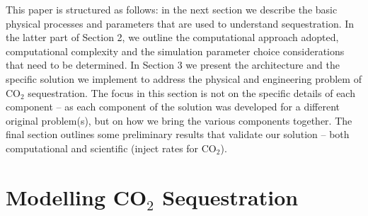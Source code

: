 \documentclass{acm_proc_article-sp}
\newcommand{\up}{\vspace*{-0.3em}}
\newcommand{\jhanote}[1]{ {\textcolor{red} { ***Jha: #1 }}}
\newcommand{\yyenote}[1]{ {\textcolor{blue} { ***yye00: #1 }}}
\newcommand{\jhanote}[1]{}
\newcommand{\yyenote}[1]{}
\begin{document}
This paper is structured as follows: in the next section we describe the basic
physical processes and parameters that are used to understand
sequestration. In the latter part of Section 2, we outline the
computational approach adopted, computational complexity and the
simulation parameter choice considerations that need to be determined.
In Section 3 we present the architecture and the specific solution we
implement to address the physical and engineering problem of CO$_2$
sequestration. The focus in this section is not on the specific
details of each component -- as each component of the solution was
developed for a different original problem(s), but on how we bring the
various components together.  The final section outlines some
preliminary results that validate our solution -- both computational
and scientific (inject rates for CO$_2$).



\up\up
\section{Modelling CO$_2$ Sequestration}


\up
\end{document}

